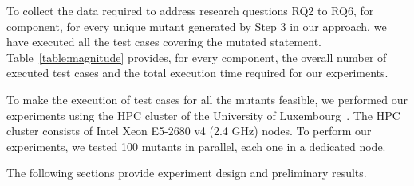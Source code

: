 %



 {To collect the data required to address research questions RQ2 to RQ6, for component, for every unique mutant generated by Step 3 in our approach, we have executed all the test cases covering the mutated statement. Table~\ref{table:magnitude} provides, for every component, the overall number of executed test cases and the total execution time required for our experiments. 
 } 

To make the execution of test cases for all the mutants feasible, we performed our experiments using the HPC cluster of the University of Luxembourg~\cite{HPC}.
The HPC cluster consists of Intel Xeon E5-2680 v4 (2.4 GHz) nodes. To perform our experiments, we tested 100 mutants in parallel, each one in a dedicated node.

The following sections provide experiment design and preliminary results. 



% 


